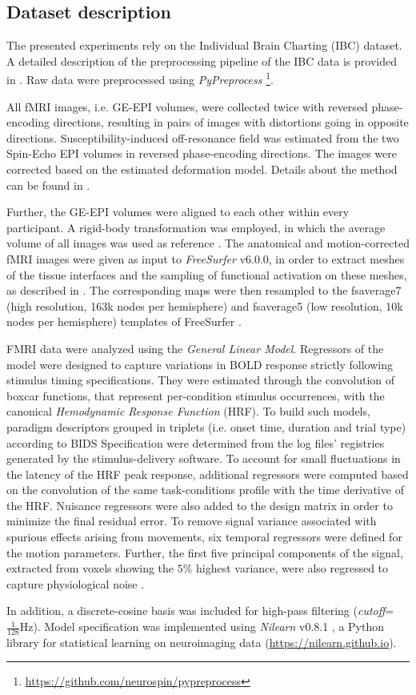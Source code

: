 \subsection{Dataset description}
%
The presented experiments rely on the Individual Brain Charting (IBC) dataset.
%
A detailed description of the preprocessing pipeline of the IBC data is provided
in \citep{Pinho2021}.
%
Raw data were preprocessed using \emph{PyPreprocess}
\footnote{\url{https://github.com/neurospin/pypreprocess}}.

All fMRI images, i.e. GE-EPI volumes, were collected twice with reversed
phase-encoding directions, resulting in pairs of images with distortions going
in opposite directions.
%
Susceptibility-induced off-resonance field was estimated from the two Spin-Echo
EPI volumes in reversed phase-encoding directions.
%
The images were corrected based on the estimated deformation model.
%
Details about the method can be found in \citep{Andersson2003}.

Further, the GE-EPI volumes were aligned to each other within every participant.
%
A rigid-body transformation was employed, in which the average volume of all
images was used as reference \citep{Friston1995}.
%
The anatomical and motion-corrected fMRI images were given as input to
\emph{FreeSurfer} v6.0.0, in order to extract meshes of the tissue
interfaces and the sampling of functional activation on these meshes, as
described in \citep{vanessen2012}.
%
The corresponding maps were then resampled to the fsaverage7 (high resolution,
163k nodes per hemisphere) and fsaverage5 (low resolution, 10k nodes per hemisphere) templates of
FreeSurfer \citep{Fischl1999}.

FMRI data were analyzed using the \textit{General Linear Model}.
%
Regressors of the model were designed to capture variations in BOLD response
strictly following stimulus timing specifications.
%
They were estimated through the convolution of boxcar functions, that represent
per-condition stimulus occurrences, with the canonical \textit{Hemodynamic
  Response Function} (HRF).
%
To build such models, paradigm descriptors grouped in triplets (i.e. onset time,
duration and trial type) according to BIDS Specification were determined from
the log files' registries generated by the stimulus-delivery software.
%
To account for small fluctuations in the latency of the HRF peak response,
additional regressors were computed based on the convolution of the same
task-conditions profile with the time derivative of the HRF.
%
Nuisance regressors were also added to the design matrix in order to minimize
the final residual error.
%
To remove signal variance associated with spurious effects arising from
movements, six temporal regressors were defined for the motion parameters.
%
Further, the first five principal components of the signal, extracted from
voxels showing the $5\%$ highest variance, were also regressed to capture
physiological noise \citep{Behzadi2007}.

In addition, a discrete-cosine basis was included for high-pass filtering
(\textit{cutoff}=$\frac{1}{128}\textrm{Hz}$).
%
Model specification was implemented using \textit{Nilearn} v0.8.1
\citep{Abraham2014}, a Python library for statistical learning on neuroimaging
data (\url{https://nilearn.github.io}).